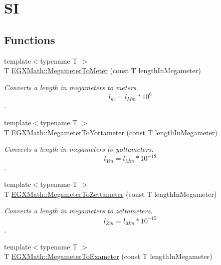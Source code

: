 \hypertarget{group___e_g_x_math-_conversions-_length_conversions-_megameter-_s_i}{}\section{SI}
\label{group___e_g_x_math-_conversions-_length_conversions-_megameter-_s_i}
\subsection*{Functions}
\begin{DoxyCompactItemize}
\item 
{\footnotesize template$<$typename T $>$ }\\T \mbox{\hyperlink{group___e_g_x_math-_conversions-_length_conversions-_megameter-_s_i_gadd3d707010ed78d623f4fbb5b8d72338}{E\+G\+X\+Math\+::\+Megameter\+To\+Meter}} (const T length\+In\+Megameter)
\begin{DoxyCompactList}\small\item\em Converts a length in megameters to meters. \[ l_{m}=l_{Mm} * 10^{6}\]. \end{DoxyCompactList}\item 
{\footnotesize template$<$typename T $>$ }\\T \mbox{\hyperlink{group___e_g_x_math-_conversions-_length_conversions-_megameter-_s_i_ga3d729dabc7c37d927c02cf4ae0c560d4}{E\+G\+X\+Math\+::\+Megameter\+To\+Yottameter}} (const T length\+In\+Megameter)
\begin{DoxyCompactList}\small\item\em Converts a length in megameters to yottameters. \[ l_{Ym}=l_{Mm} * 10^{-18} \]. \end{DoxyCompactList}\item 
{\footnotesize template$<$typename T $>$ }\\T \mbox{\hyperlink{group___e_g_x_math-_conversions-_length_conversions-_megameter-_s_i_ga3a8765b61b237025a1f8a72a25443cd7}{E\+G\+X\+Math\+::\+Megameter\+To\+Zettameter}} (const T length\+In\+Megameter)
\begin{DoxyCompactList}\small\item\em Converts a length in megameters to zettameters. \[ l_{Zm}=l_{Mm} * 10^{-15} \]. \end{DoxyCompactList}\item 
{\footnotesize template$<$typename T $>$ }\\T \mbox{\hyperlink{group___e_g_x_math-_conversions-_length_conversions-_megameter-_s_i_ga30aed22a379d3215a2d660a4219c6936}{E\+G\+X\+Math\+::\+Megameter\+To\+Exameter}} (const T length\+In\+Megameter)

\end{DoxyCompactItemize}

